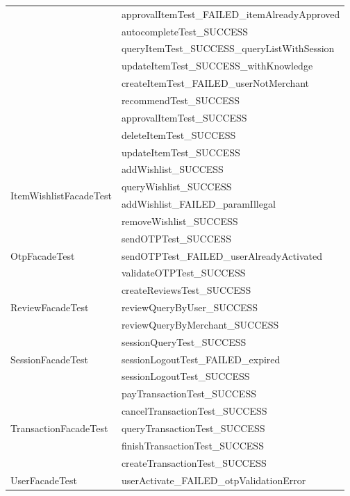 \documentclass[a4paper]{article}
\begin{document}
\begin{enumerate}
\begin{longtable}[c]{|l|l|}
 & approvalItemTest\_FAILED\_itemAlreadyApproved \\ \cline{2-2} 
 & autocompleteTest\_SUCCESS \\ \cline{2-2} 
 & queryItemTest\_SUCCESS\_queryListWithSession \\ \cline{2-2} 
 & updateItemTest\_SUCCESS\_withKnowledge \\ \cline{2-2} 
 & createItemTest\_FAILED\_userNotMerchant \\ \cline{2-2} 
 & recommendTest\_SUCCESS \\ \cline{2-2} 
 & approvalItemTest\_SUCCESS \\ \cline{2-2} 
 & deleteItemTest\_SUCCESS \\ \cline{2-2} 
 & updateItemTest\_SUCCESS \\ \hline
\multirow{4}{*}{ItemWishlistFacadeTest} & addWishlist\_SUCCESS \\ \cline{2-2} 
 & queryWishlist\_SUCCESS \\ \cline{2-2} 
 & addWishlist\_FAILED\_paramIllegal \\ \cline{2-2} 
 & removeWishlist\_SUCCESS \\ \hline
\multirow{3}{*}{OtpFacadeTest} & sendOTPTest\_SUCCESS \\ \cline{2-2} 
 & sendOTPTest\_FAILED\_userAlreadyActivated \\ \cline{2-2} 
 & validateOTPTest\_SUCCESS \\ \hline
\multirow{3}{*}{ReviewFacadeTest} & createReviewsTest\_SUCCESS \\ \cline{2-2} 
 & reviewQueryByUser\_SUCCESS \\ \cline{2-2} 
 & reviewQueryByMerchant\_SUCCESS \\ \hline
\multirow{3}{*}{SessionFacadeTest} & sessionQueryTest\_SUCCESS \\ \cline{2-2} 
 & sessionLogoutTest\_FAILED\_expired \\ \cline{2-2} 
 & sessionLogoutTest\_SUCCESS \\ \hline
\multirow{5}{*}{TransactionFacadeTest} & payTransactionTest\_SUCCESS \\ \cline{2-2} 
 & cancelTransactionTest\_SUCCESS \\ \cline{2-2} 
 & queryTransactionTest\_SUCCESS \\ \cline{2-2} 
 & finishTransactionTest\_SUCCESS \\ \cline{2-2} 
 & createTransactionTest\_SUCCESS \\ \hline
\multirow{25}{*}{UserFacadeTest} & userActivate\_FAILED\_otpValidationError \\ \cline{2-2} 

\end{longtable}
\end{enumerate}
\end{document}
